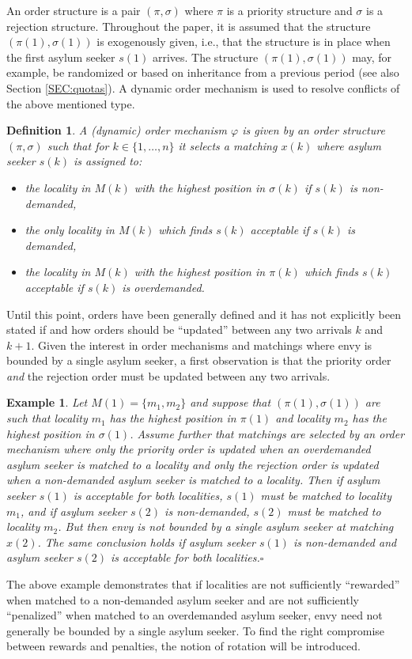 \documentclass[12pt,fleqn]{article}
\newtheorem{definition}{Definition}
\newtheorem{example}{Example}
\begin{document}
An order structure is a pair $(\pi,\sigma)$ where $\pi$ is a priority structure and $\sigma$ is a rejection structure. Throughout the paper, it is assumed that the structure $(\pi(1),\sigma(1))$ is exogenously given, i.e., that the structure is in place when the first asylum seeker $s(1)$ arrives. The structure $(\pi(1),\sigma(1))$ may, for example, be randomized or based on inheritance from a previous period (see also Section \ref{SEC:quotas}). A dynamic order mechanism is used to resolve conflicts of the above mentioned type.
\begin{definition}\rm\label{DEF:Structure_Mechanism}
A (dynamic) order mechanism $\varphi$ is given by an order structure $(\pi,\sigma)$ such that for $k\in\{1,\ldots,n\}$ it selects a matching $x(k)$ where asylum seeker $s(k)$ is assigned to:
\begin{itemize}
\item[(i)] the locality in $M(k)$ with the highest position in $\sigma(k)$ if $s(k)$ is non-demanded,
\item[(ii)] the only locality in $M(k)$ which finds $s(k)$ acceptable if $s(k)$ is demanded,
\item[(iii)] the locality in $M(k)$ with the highest position in $\pi(k)$ which finds $s(k)$ acceptable if $s(k)$ is overdemanded.
\end{itemize}
\end{definition}
\noindent Until this point, orders have been generally defined and it has not explicitly been stated if and how orders should be ``updated'' between any two arrivals $k$ and $k+1$. Given the interest in order mechanisms and matchings where envy is bounded by a single asylum seeker, a first observation is that the priority order \emph{and} the rejection order must be updated between any two arrivals.
\begin{example}\rm
Let $M(1)=\{m_1,m_2\}$ and suppose that $(\pi(1),\sigma(1))$ are such that locality $m_1$ has the highest position in $\pi(1)$ and locality $m_2$ has the highest position in $\sigma(1)$. Assume further that matchings are selected by an order mechanism where \emph{only} the priority order is updated when an overdemanded asylum seeker is matched to a locality and \emph{only} the rejection order is updated when a non-demanded asylum seeker is matched to a locality. Then if asylum seeker $s(1)$ is acceptable for both localities, $s(1)$ must be matched to locality $m_1$, and if asylum seeker $s(2)$ is non-demanded, $s(2)$ must be matched to locality $m_2$. But then envy is not bounded by a single asylum seeker at matching $x(2)$. The same conclusion holds if asylum seeker $s(1)$ is non-demanded and asylum seeker $s(2)$ is acceptable for both localities.\hfill$\square$
\end{example}
\noindent The above example demonstrates that if localities are not sufficiently ``rewarded'' when matched to a non-demanded asylum seeker and are not sufficiently ``penalized'' when matched to an overdemanded asylum seeker, envy need not generally be bounded by a single asylum seeker. To find the right compromise between rewards and penalties, the notion of rotation will be introduced.
\end{document}
